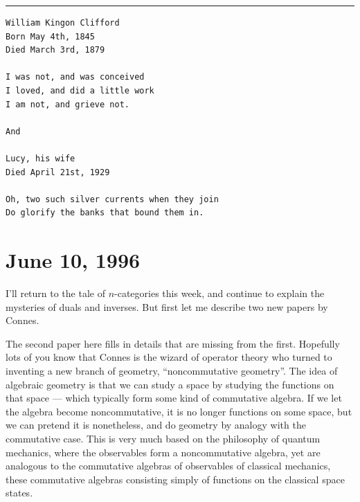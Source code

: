 \documentclass{article}
\renewcommand{\texttt}[1]{%
  \begingroup
  \ttfamily
  \begingroup\lccode`~=`/\lowercase{\endgroup\def~}{/\discretionary{}{}{}}%
  \begingroup\lccode`~=`[\lowercase{\endgroup\def~}{[\discretionary{}{}{}}%
  \begingroup\lccode`~=`.\lowercase{\endgroup\def~}{.\discretionary{}{}{}}%
  \catcode`/=\active\catcode`[=\active\catcode`.=\active
  \scantokens{#1\noexpand}%
  \endgroup
}
\begin{document}
\begin{center}\rule{0.5\linewidth}{0.5pt}\end{center}

\begin{verbatim}
William Kingon Clifford
Born May 4th, 1845
Died March 3rd, 1879

I was not, and was conceived
I loved, and did a little work
I am not, and grieve not.

And

Lucy, his wife
Died April 21st, 1929

Oh, two such silver currents when they join
Do glorify the banks that bound them in.
\end{verbatim}
\hypertarget{week83}{%
\section{June 10, 1996}\label{week83}}

I'll return to the tale of \(n\)-categories this week, and continue to
explain the mysteries of duals and inverses. But first let me describe
two new papers by Connes.


The second paper here fills in details that are missing from the first.
Hopefully lots of you know that Connes is the wizard of operator theory
who turned to inventing a new branch of geometry, ``noncommutative
geometry''. The idea of algebraic geometry is that we can study a space
by studying the functions on that space --- which typically form some
kind of commutative algebra. If we let the algebra become
noncommutative, it is no longer functions on some space, but we can
pretend it is nonetheless, and do geometry by analogy with the
commutative case. This is very much based on the philosophy of quantum
mechanics, where the observables form a noncommutative algebra, yet are
analogous to the commutative algebras of observables of classical
mechanics, these commutative algebras consisting simply of functions on
the classical space states.
\end{document}

